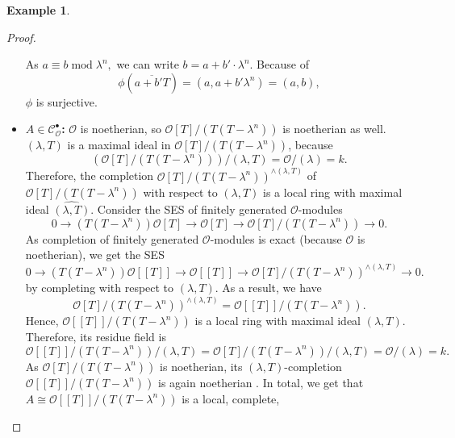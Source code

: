 \documentclass{article}
\theoremstyle{plain}%
\theoremstyle{definition}
\newtheorem{example}[theorem]{Example}
\theoremstyle{remark}
\newcommand{\cob}{\mathcal{C}_\mathcal{O}^\bullet}
\begin{document}
\begin{example}
\begin{proof}
\begin{itemize}
                As \(a \equiv b \operatorname{mod} \lambda^n,\) we can write \(b = a + b' \cdot \lambda^n\). 
                Because of
                \[\phi(\overline{a + b'T}) = (a, a + b' \lambda^n) = (a,b),\] 
                \(\phi\) is surjective.
            \item \textbf{\(A\in \cob\):}
                \(\mathcal{O}\) is noetherian, so \(\mathcal{O}[T]/(T(T-\lambda^n))\) is noetherian as well.
                \((\lambda, T)\) is a maximal ideal in \(\mathcal{O}[T]/(T(T-\lambda^n))\), because
                \[\left(\mathcal{O}[T]/(T(T-\lambda^n))\right)/(\lambda, T) = \mathcal{O}/(\lambda) = k.\]
                Therefore, the completion \(\mathcal{O}[T]/(T(T-\lambda^n))^{\wedge(\lambda, T)}\) 
                of \(\mathcal{O}[T]/(T(T-\lambda^n))\) with respect to \((\lambda, T)\) is a local ring 
                with maximal ideal \(\widehat{(\lambda, T)}\).
                Consider the SES of finitely generated \(\mathcal{O}\)-modules
                \[
                    0 \to (T(T - \lambda^n)) \mathcal{O}[T] \to \mathcal{O}[T] 
                    \to \mathcal{O}[T]/(T(T-\lambda^n)) \to 0.
                \]
                As completion of finitely generated \(\mathcal{O}\)-modules is exact 
                (because \(\mathcal{O}\) is noetherian), we get the SES
                \[
                    0 \to (T(T-\lambda^n))\mathcal{O}[[T]] \to \mathcal{O}[[T]] 
                    \to \mathcal{O}[T]/(T(T-\lambda^n))^{\wedge (\lambda, T)}  \to 0.
                \]
                by completing with respect to \((\lambda, T)\).
                As a result, we have
                \[
                    \mathcal{O}[T]/(T(T-\lambda^n))^{\wedge (\lambda, T)} = \mathcal{O}[[T]]/(T(T-\lambda^n)).
                \]
                Hence, \(\mathcal{O}[[T]]/(T(T-\lambda^n))\) is a local ring with maximal ideal \((\lambda, T)\).
                Therefore, its residue field is
                \[
                    \mathcal{O}[[T]]/(T(T-\lambda^n))/(\lambda, T) = \mathcal{O}[T]/(T(T-\lambda^n))/(\lambda, T) 
                    = \mathcal{O}/(\lambda) = k.
                \]
                As \(\mathcal{O}[T]/(T(T-\lambda^n))\) is noetherian, its \((\lambda, T)\)-completion 
                \(\mathcal{O}[[T]]/(T(T-\lambda^n))\) is again noetherian \cite[cf.][theorem 10.26]{Atiyah1969}.
                In total, we get that \(A \cong \mathcal{O}[[T]]/(T(T-\lambda^n))\) is a local, complete, 

\end{itemize}
\end{proof}
\end{example}
\end{document}
